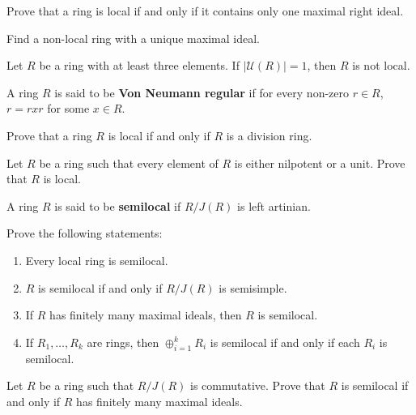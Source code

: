 \begin{exercise}
\label{xca:local_right}
    Prove that a ring is local if and only if it contains only one maximal right ideal.
\end{exercise}

\begin{exercise}
\label{xca:non_local1}
    Find a non-local ring with a unique maximal ideal. 
\end{exercise}

\begin{exercise}
\label{xca:non_local2}
    Let $R$ be a ring with at least three elements. 
    If $|\mathcal{U}(R)|=1$, then $R$ is not local. 
\end{exercise}

A ring $R$ is said to be \textbf{Von Neumann regular} if  
for every non-zero $r\in R$, $r=rxr$ for some $x\in R$. 

\begin{exercise}
\label{xca:VonNeumann_local}
    Prove that a ring $R$ is local if and only if $R$ is a division ring. 
\end{exercise}

\begin{exercise}
\label{xca:nilp_or_unit}
    Let $R$ be a ring such that every element of $R$ is either 
    nilpotent or a unit. Prove that $R$ is local. 
\end{exercise}

A ring $R$ is said to be \textbf{semilocal} if $R/J(R)$ is left artinian. 

\begin{exercise}
\label{xca:semilocal}
    Prove the following statements:
    \begin{enumerate}
        \item Every local ring is semilocal.
        \item $R$ is semilocal if and only if $R/J(R)$ is semisimple.
        \item If $R$ has finitely many maximal ideals, then $R$ is semilocal. 
        \item If $R_1,\dots,R_k$ are rings, then $\oplus_{i=1}^k R_i$ is semilocal
            if and only if each $R_i$ is semilocal. 
    \end{enumerate}
\end{exercise}

\begin{example}
\label{xca:semilocal_commutative}
    Let $R$ be a ring such that $R/J(R)$ is commutative. Prove
    that $R$ is semilocal if and only if $R$ has finitely many maximal ideals. 
\end{example}

